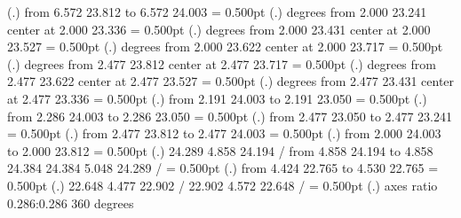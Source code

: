 {\setplotsymbol ({\thinlinefont .})
{\color[rgb]{0,0,0}\putrule from  6.572 23.812 to  6.572 24.003
}%
%
%
\linethickness= 0.500pt
\setplotsymbol ({\thinlinefont .})
{\color[rgb]{0,0,0} degrees from  2.000 23.241 center at  2.000 23.336
}%
%
%
\linethickness= 0.500pt
\setplotsymbol ({\thinlinefont .})
{\color[rgb]{0,0,0} degrees from  2.000 23.431 center at  2.000 23.527
}%
%
%
\linethickness= 0.500pt
\setplotsymbol ({\thinlinefont .})
{\color[rgb]{0,0,0} degrees from  2.000 23.622 center at  2.000 23.717
}%
%
%
\linethickness= 0.500pt
\setplotsymbol ({\thinlinefont .})
{\color[rgb]{0,0,0} degrees from  2.477 23.812 center at  2.477 23.717
}%
%
%
\linethickness= 0.500pt
\setplotsymbol ({\thinlinefont .})
{\color[rgb]{0,0,0} degrees from  2.477 23.622 center at  2.477 23.527
}%
%
%
\linethickness= 0.500pt
\setplotsymbol ({\thinlinefont .})
{\color[rgb]{0,0,0} degrees from  2.477 23.431 center at  2.477 23.336
}%
%
%
\linethickness= 0.500pt
\setplotsymbol ({\thinlinefont .})
{\color[rgb]{0,0,0}\putrule from  2.191 24.003 to  2.191 23.050
}%
%
%
\linethickness= 0.500pt
\setplotsymbol ({\thinlinefont .})
{\color[rgb]{0,0,0}\putrule from  2.286 24.003 to  2.286 23.050
}%
%
%
\linethickness= 0.500pt
\setplotsymbol ({\thinlinefont .})
{\color[rgb]{0,0,0}\putrule from  2.477 23.050 to  2.477 23.241
}%
%
%
\linethickness= 0.500pt
\setplotsymbol ({\thinlinefont .})
{\color[rgb]{0,0,0}\putrule from  2.477 23.812 to  2.477 24.003
}%
%
%
\linethickness= 0.500pt
\setplotsymbol ({\thinlinefont .})
{\color[rgb]{0,0,0}\putrule from  2.000 24.003 to  2.000 23.812
}%
%
%
\linethickness= 0.500pt
\setplotsymbol ({\thinlinefont .})
{\color[rgb]{0,0,0} 24.289  4.858 24.194 /
\putrule from  4.858 24.194 to  4.858 24.384
 24.384  5.048 24.289 /
}%
%
%
\linethickness= 0.500pt
\setplotsymbol ({\thinlinefont .})
{\color[rgb]{0,0,0}\putrule from  4.424 22.765 to  4.530 22.765
}%
%
%
\linethickness= 0.500pt
\setplotsymbol ({\thinlinefont .})
{\color[rgb]{0,0,0} 22.648  4.477 22.902 /
 22.902  4.572 22.648 /
}%
%
%
\linethickness= 0.500pt
\setplotsymbol ({\thinlinefont .})
{\color[rgb]{0,0,0}\ellipticalarc axes ratio  0.286:0.286  360 degrees 
}}
